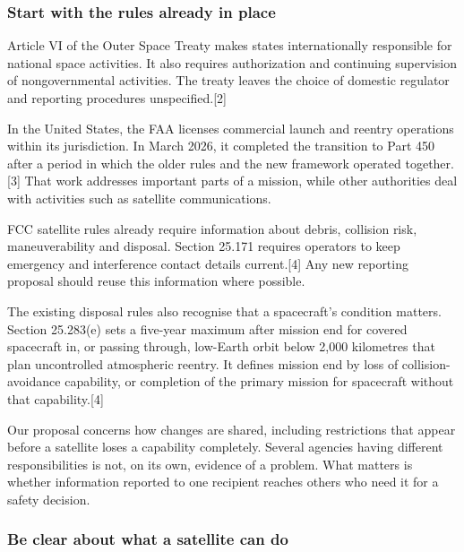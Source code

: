 \documentclass[11pt,letterpaper]{article}
\begin{document}
\hypertarget{start-with-the-rules-already-in-place}{%
\subsubsection{Start with the rules already in
place}\label{start-with-the-rules-already-in-place}}

Article VI of the Outer Space Treaty makes states internationally
responsible for national space activities. It also requires
authorization and continuing supervision of nongovernmental activities.
The treaty leaves the choice of domestic regulator and reporting
procedures unspecified.{[}2{]}

In the United States, the FAA licenses commercial launch and reentry
operations within its jurisdiction. In March 2026, it completed the
transition to Part 450 after a period in which the older rules and the
new framework operated together.{[}3{]} That work addresses important
parts of a mission, while other authorities deal with activities such as
satellite communications.

FCC satellite rules already require information about debris, collision
risk, maneuverability and disposal. Section 25.171 requires operators to
keep emergency and interference contact details current.{[}4{]} Any new
reporting proposal should reuse this information where possible.

The existing disposal rules also recognise that a spacecraft's condition
matters. Section 25.283(e) sets a five-year maximum after mission end
for covered spacecraft in, or passing through, low-Earth orbit below
2,000 kilometres that plan uncontrolled atmospheric reentry. It defines
mission end by loss of collision-avoidance capability, or completion of
the primary mission for spacecraft without that capability.{[}4{]}

Our proposal concerns how changes are shared, including restrictions
that appear before a satellite loses a capability completely. Several
agencies having different responsibilities is not, on its own, evidence
of a problem. What matters is whether information reported to one
recipient reaches others who need it for a safety decision.

\hypertarget{be-clear-about-what-a-satellite-can-do}{%
\subsubsection{Be clear about what a satellite can
do}\label{be-clear-about-what-a-satellite-can-do}}
\end{document}
